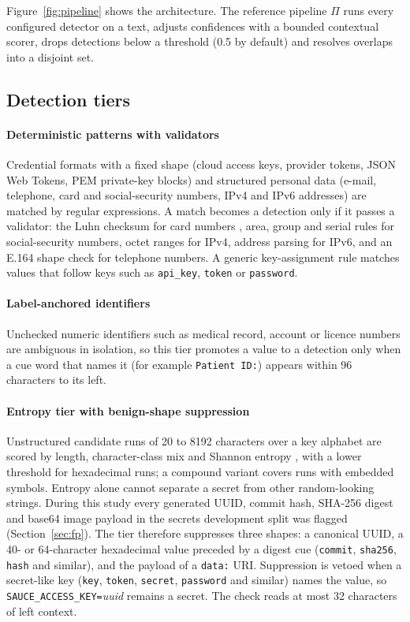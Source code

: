 \documentclass[pdflatex,sn-mathphys-num]{sn-jnl}
\theoremstyle{\ssThmStyle}
\theoremstyle{\ssDefStyle}
\begin{document}
Figure~\ref{fig:pipeline} shows the architecture. The reference pipeline $\Pi$ runs every configured detector on a text, adjusts confidences with a bounded contextual scorer, drops detections below a threshold (0.5 by default) and resolves overlaps into a disjoint set.

\subsection{Detection tiers}\label{sec:tiers}

\paragraph{Deterministic patterns with validators}
Credential formats with a fixed shape (cloud access keys, provider tokens, JSON Web Tokens, PEM private-key blocks) and structured personal data (e-mail, telephone, card and social-security numbers, IPv4 and IPv6 addresses) are matched by regular expressions. A match becomes a detection only if it passes a validator: the Luhn checksum for card numbers \cite{luhn1960}, area, group and serial rules for social-security numbers, octet ranges for IPv4, address parsing for IPv6, and an E.164 shape check for telephone numbers. A generic key-assignment rule matches values that follow keys such as \texttt{api\_key}, \texttt{token} or \texttt{password}.

\paragraph{Label-anchored identifiers}
Unchecked numeric identifiers such as medical record, account or licence numbers are ambiguous in isolation, so this tier promotes a value to a detection only when a cue word that names it (for example \texttt{Patient ID:}) appears within 96 characters to its left.

\paragraph{Entropy tier with benign-shape suppression}
Unstructured candidate runs of 20 to 8192 characters over a key alphabet are scored by length, character-class mix and Shannon entropy \cite{shannon1948}, with a lower threshold for hexadecimal runs; a compound variant covers runs with embedded symbols. Entropy alone cannot separate a secret from other random-looking strings. During this study every generated UUID, commit hash, SHA-256 digest and base64 image payload in the secrets development split was flagged (Section~\ref{sec:fp}). The tier therefore suppresses three shapes: a canonical UUID, a 40- or 64-character hexadecimal value preceded by a digest cue (\texttt{commit}, \texttt{sha256}, \texttt{hash} and similar), and the payload of a \texttt{data:} URI. Suppression is vetoed when a secret-like key (\texttt{key}, \texttt{token}, \texttt{secret}, \texttt{password} and similar) names the value, so \texttt{SAUCE\_ACCESS\_KEY=}\textit{uuid} remains a secret. The check reads at most 32 characters of left context.
\end{document}
